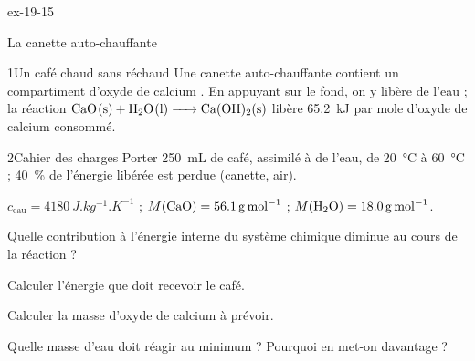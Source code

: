 \begin{blocLivre}{ex-19-15}
\begin{exercice}[3]{La canette auto-chauffante}
\begin{docu}{1}{Un café chaud sans réchaud}
Une canette auto-chauffante contient un compartiment d'oxyde de calcium . En appuyant sur le fond, on y libère de
l'eau ; la réaction $\ce{CaO(s) + H2O(l) -> Ca(OH)2(s)}$ libère \qty{65,2}{kJ} par mole d'oxyde de calcium consommé.
\end{docu}
\begin{docu}{2}{Cahier des charges}
Porter \qty{250}{mL} de café, assimilé à de l'eau, de \qty{20}{\degreeCelsius} à \qty{60}{\degreeCelsius} ; 40~\% de l'énergie libérée
est perdue (canette, air).
\end{docu}
\begin{donnees}
$c_\mathrm{eau}=\qty{4180}{J.kg^{-1}.K^{-1}}$ ; $M(\ce{CaO})=\qty{56,1}{g.mol^{-1}}$ ; $M(\ce{H2O})=\qty{18,0}{g.mol^{-1}}$.
\end{donnees}
\begin{questions}
\item Quelle contribution à l'énergie interne du système chimique diminue au cours de la réaction ?
\item Calculer l'énergie que doit recevoir le café.
\item \initiative Calculer la masse d'oxyde de calcium à prévoir.
\item Quelle masse d'eau doit réagir au minimum ? Pourquoi en met-on davantage ?
\end{questions}
\end{exercice}
\end{blocLivre}
